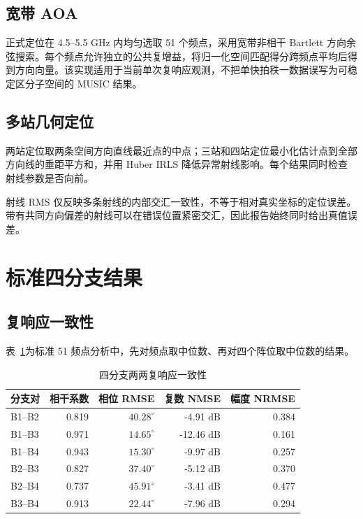 \documentclass[UTF8,12pt,a4paper]{ctexart}
\begin{document}
\subsection{宽带 AOA}

正式定位在 4.5--5.5 GHz 内均匀选取 51 个频点，采用宽带非相干 Bartlett 方向余弦搜索。每个频点允许独立的公共复增益，将归一化空间匹配得分跨频点平均后得到方向向量。该实现适用于当前单次复响应观测，不把单快拍秩一数据误写为可稳定区分子空间的 MUSIC 结果。

\subsection{多站几何定位}

两站定位取两条空间方向直线最近点的中点；三站和四站定位最小化估计点到全部方向线的垂距平方和，并用 Huber IRLS 降低异常射线影响。每个结果同时检查射线参数是否向前。

射线 RMS 仅反映多条射线的内部交汇一致性，不等于相对真实坐标的定位误差。带有共同方向偏差的射线可以在错误位置紧密交汇，因此报告始终同时给出真值误差。

\section{标准四分支结果}

\subsection{复响应一致性}

表~\ref{tab:agreement}为标准 51 频点分析中，先对频点取中位数、再对四个阵位取中位数的结果。

\begin{table}[H]
  \centering
  \caption{四分支两两复响应一致性}
  \label{tab:agreement}
  \begin{tabular}{lrrrr}
    \toprule
    分支对 & 相干系数 & 相位 RMSE & 复数 NMSE & 幅度 NRMSE \\
    \midrule
    B1--B2 & 0.819 & $40.28^\circ$ & -4.91 dB & 0.384 \\
    B1--B3 & 0.971 & $14.65^\circ$ & -12.46 dB & 0.161 \\
    B1--B4 & 0.943 & $15.30^\circ$ & -9.97 dB & 0.257 \\
    B2--B3 & 0.827 & $37.40^\circ$ & -5.12 dB & 0.370 \\
    B2--B4 & 0.737 & $45.91^\circ$ & -3.41 dB & 0.477 \\
    B3--B4 & 0.913 & $22.44^\circ$ & -7.96 dB & 0.294 \\
    \bottomrule
  \end{tabular}
\end{table}
\end{document}
